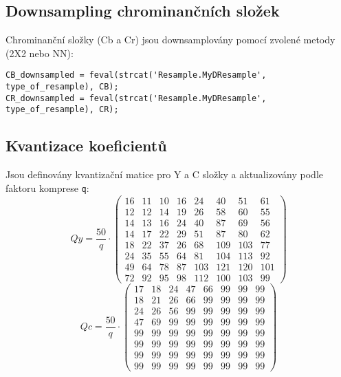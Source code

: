 \subsection*{Downsampling chrominančních složek}
Chrominanční složky (Cb a Cr) jsou downsamplovány pomocí zvolené metody (2X2 nebo NN):
\begin{verbatim}
CB_downsampled = feval(strcat('Resample.MyDResample', type_of_resample), CB);
CR_downsampled = feval(strcat('Resample.MyDResample', type_of_resample), CR);
\end{verbatim}

\subsection*{Kvantizace koeficientů}
Jsou definovány kvantizační matice pro Y a C složky a aktualizovány podle faktoru komprese \texttt{q}\cite{pIDhmNtdwMgbcGoe}\cite{ygeiGeoinf2}:
\[
Qy = \frac{50}{q} \cdot \begin{pmatrix}
16 & 11 & 10 & 16 & 24 & 40 & 51 & 61 \\
12 & 12 & 14 & 19 & 26 & 58 & 60 & 55 \\
14 & 13 & 16 & 24 & 40 & 87 & 69 & 56 \\
14 & 17 & 22 & 29 & 51 & 87 & 80 & 62 \\
18 & 22 & 37 & 26 & 68 & 109 & 103 & 77 \\
24 & 35 & 55 & 64 & 81 & 104 & 113 & 92 \\
49 & 64 & 78 & 87 & 103 & 121 & 120 & 101 \\
72 & 92 & 95 & 98 & 112 & 100 & 103 & 99
\end{pmatrix}
\]
\[
Qc = \frac{50}{q} \cdot \begin{pmatrix}
17 & 18 & 24 & 47 & 66 & 99 & 99 & 99 \\
18 & 21 & 26 & 66 & 99 & 99 & 99 & 99 \\
24 & 26 & 56 & 99 & 99 & 99 & 99 & 99 \\
47 & 69 & 99 & 99 & 99 & 99 & 99 & 99 \\
99 & 99 & 99 & 99 & 99 & 99 & 99 & 99 \\
99 & 99 & 99 & 99 & 99 & 99 & 99 & 99 \\
99 & 99 & 99 & 99 & 99 & 99 & 99 & 99 \\
99 & 99 & 99 & 99 & 99 & 99 & 99 & 99
\end{pmatrix}
\]


